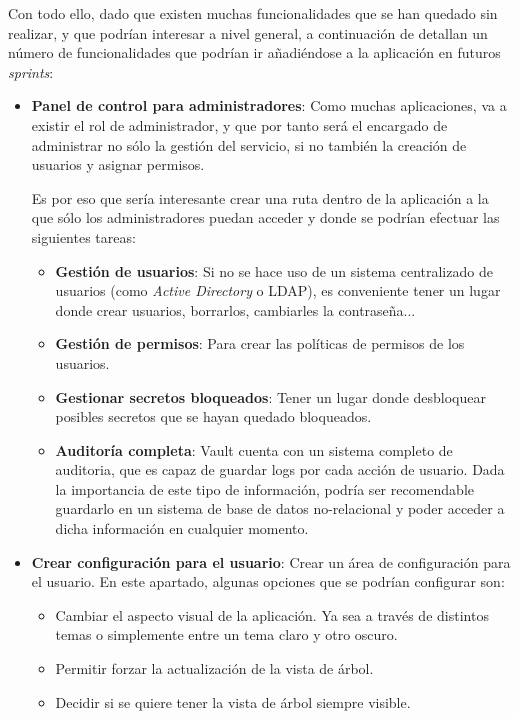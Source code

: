 \documentclass{\ClassPath/viu-tfm-template}
\begin{document}
Con todo ello, dado que existen muchas funcionalidades que se han quedado sin realizar, y que podrían interesar a nivel general, a continuación de detallan un número de funcionalidades que podrían ir añadiéndose a la aplicación en futuros \textit{sprints}:

\begin{itemize}
    \item \textbf{Panel de control para administradores}: Como muchas aplicaciones, va a existir el rol de administrador, y que por tanto será el encargado de administrar no sólo la gestión del servicio, si no también la creación de usuarios y asignar permisos.

    Es por eso que sería interesante crear una ruta dentro de la aplicación a la que sólo los administradores puedan acceder y donde se podrían efectuar las siguientes tareas:

    \begin{itemize}
        \item \textbf{Gestión de usuarios}: Si no se hace uso de un sistema centralizado de usuarios (como \textit{Active Directory} o LDAP), es conveniente tener un lugar donde crear usuarios, borrarlos, cambiarles la contraseña...
        \item \textbf{Gestión de permisos}: Para crear las políticas de permisos de los usuarios.
        \item \textbf{Gestionar secretos bloqueados}: Tener un lugar donde desbloquear posibles secretos que se hayan quedado bloqueados.
        \item \textbf{Auditoría completa}: Vault cuenta con un sistema completo de auditoria, que es capaz de guardar logs por cada acción de usuario. Dada la importancia de este tipo de información, podría ser recomendable guardarlo en un sistema de base de datos no-relacional y poder acceder a dicha información en cualquier momento.
    \end{itemize}

    \item \textbf{Crear configuración para el usuario}: Crear un área de configuración para el usuario. En este apartado, algunas opciones que se podrían configurar son:

    \begin{itemize}
        \item Cambiar el aspecto visual de la aplicación. Ya sea a través de distintos temas o simplemente entre un tema claro y otro oscuro.
        \item Permitir forzar la actualización de la vista de árbol.
        \item Decidir si se quiere tener la vista de árbol siempre visible.
    \end{itemize}


\end{itemize}
\end{document}
